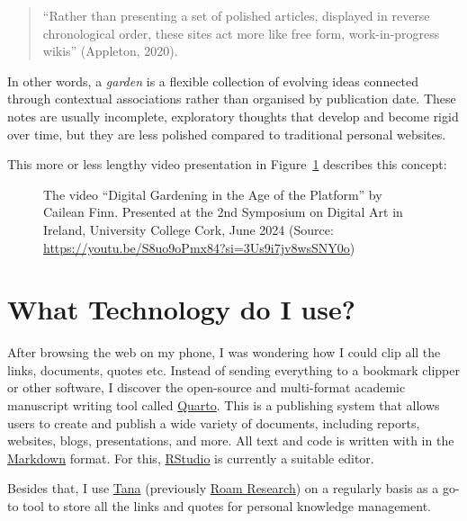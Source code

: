 \documentclass[
]{agujournal2019}
\begin{document}
\begin{quote}
``Rather than presenting a set of polished articles, displayed in
reverse chronological order, these sites act more like free form,
work-in-progress wikis'' (Appleton, 2020).
\end{quote}

In other words, a \emph{garden} is a flexible collection of evolving
ideas connected through contextual associations rather than organised by
publication date. These notes are usually incomplete, exploratory
thoughts that develop and become rigid over time, but they are less
polished compared to traditional personal websites.

This more or less lengthy video presentation in
Figure~\ref{fig-digitalgarden} describes this concept:

\begin{figure}


\caption{\label{fig-digitalgarden}The video ``Digital Gardening in the
Age of the Platform'' by Cailean Finn. Presented at the 2nd Symposium on
Digital Art in Ireland, University College Cork, June 2024 (Source:
\url{https://youtu.be/S8uo9oPmx84?si=3Us9i7jv8wsSNY0o})}

\end{figure}%

\section{What Technology do I use?}\label{what-technology-do-i-use}

After browsing the web on my phone, I was wondering how I could clip all
the links, documents, quotes etc. Instead of sending everything to a
bookmark clipper or other software, I discover the open-source and
multi-format academic manuscript writing tool called
\href{https://quarto.org/docs/manuscripts/authoring/rstudio.html}{Quarto}.
This is a publishing system that allows users to create and publish a
wide variety of documents, including reports, websites, blogs,
presentations, and more. All text and code is written with in the
\href{https://www.markdownguide.org/getting-started/}{Markdown} format.
For this, \href{https://posit.co/download/rstudio-desktop/}{RStudio} is
currently a suitable editor.

Besides that, I use \href{https://tana.inc/}{Tana} (previously
\href{https://roamresearch.com/}{Roam Research}) on a regularly basis as
a go-to tool to store all the links and quotes for personal knowledge
management.
\end{document}
